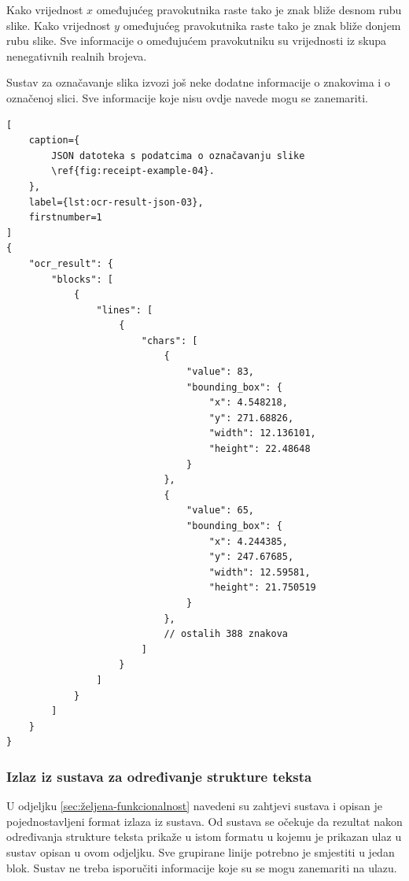 \documentclass[times, utf8, zavrsni]{fer}
\begin{document}
Kako vrijednost $x$ omeđujućeg pravokutnika raste tako je znak bliže desnom rubu
slike. Kako vrijednost $y$ omeđujućeg pravokutnika raste tako je znak bliže
donjem rubu slike. Sve informacije o omeđujućem pravokutniku su vrijednosti iz
skupa nenegativnih realnih brojeva.

Sustav za označavanje slika izvozi još neke dodatne informacije o znakovima i
o označenoj slici. Sve informacije koje nisu ovdje navede mogu se zanemariti.

\begin{lstlisting}[
    caption={
        JSON datoteka s podatcima o označavanju slike
        \ref{fig:receipt-example-04}.
    },
    label={lst:ocr-result-json-03},
    firstnumber=1
]
{
    "ocr_result": {
        "blocks": [
            {
                "lines": [
                    {
                        "chars": [
                            {
                                "value": 83,
                                "bounding_box": {
                                    "x": 4.548218,
                                    "y": 271.68826,
                                    "width": 12.136101,
                                    "height": 22.48648
                                }
                            },
                            {
                                "value": 65,
                                "bounding_box": {
                                    "x": 4.244385,
                                    "y": 247.67685,
                                    "width": 12.59581,
                                    "height": 21.750519
                                }
                            },
                            // ostalih 388 znakova
                        ]
                    }
                ]
            }
        ]
    }
}
\end{lstlisting}


\subsubsection{Izlaz iz sustava za određivanje strukture teksta}
U odjeljku \ref{sec:željena-funkcionalnost} navedeni su zahtjevi sustava i
opisan je pojednostavljeni format izlaza iz sustava. Od sustava se očekuje da
rezultat nakon određivanja strukture teksta prikaže u istom formatu u kojemu je
prikazan ulaz u sustav opisan u ovom odjeljku. Sve grupirane linije potrebno je
smjestiti u jedan blok. Sustav ne treba isporučiti informacije koje su se mogu
zanemariti na ulazu.
\end{document}
